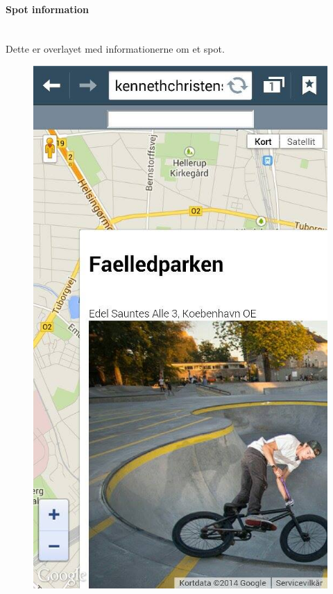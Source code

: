 \documentclass[12pt]{article}
\begin{document}
\newpage
\paragraph{Spot information}\mbox{}\\
Dette er overlayet med informationerne om et spot.\\
\begin{figure}[h]
\includegraphics[scale = 0.3]{markers}
\end{figure}
\end{document}

